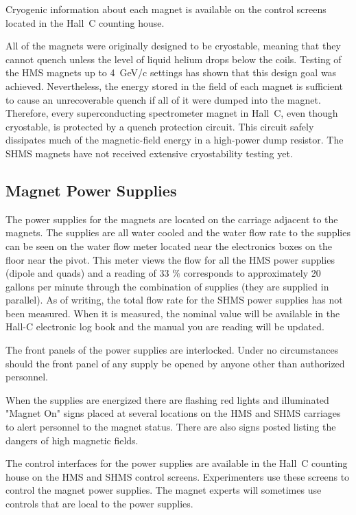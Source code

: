 {Cryogenic information about each magnet is available on the control
screens located in the Hall~C counting house.

All of the magnets were originally designed to be cryostable, meaning that they
cannot quench unless the level of liquid helium drops below the coils. Testing of
the HMS magnets up to 4~GeV/c settings has shown that this design goal
was achieved. Nevertheless, the energy stored in the field of each magnet is sufficient
to cause an unrecoverable quench if all of it were dumped into the magnet.
Therefore, every superconducting spectrometer magnet in Hall~C, even though
cryostable, is protected by a quench protection circuit. This circuit safely dissipates
much of the magnetic-field energy in a high-power dump resistor. The SHMS
magnets have not received extensive cryostability testing yet.

\subsection {Magnet Power Supplies}

The power supplies for the magnets are located on the carriage
adjacent to the magnets. The supplies are all water cooled and
the water flow rate to the supplies can be seen on the water flow
meter located near the electronics boxes on the floor near the pivot.
This meter views the flow for all the HMS power supplies
(dipole and quads) and a reading of 33 $\%$ corresponds to approximately
20 gallons per minute through the combination of supplies (they are supplied
in parallel).
As of writing, the total flow rate for the SHMS power supplies has not been
measured. When it is measured, the nominal value will be available in the Hall-C electronic log book
and the manual you are reading will be updated.

The front panels of the power supplies are interlocked. Under
no circumstances should the front panel of any supply be opened by anyone other
than authorized personnel.

When the supplies are energized there are flashing red lights  and
illuminated "Magnet On" signs placed at
several locations on the HMS and SHMS carriages to alert personnel to the magnet
status. There are also signs posted listing the dangers of high magnetic
fields.

The control interfaces for the power supplies are available in the
Hall~C counting house on the HMS and SHMS control screens. Experimenters
use these screens to control the magnet power supplies. The magnet experts
will sometimes use controls that are local to the power supplies.

}
